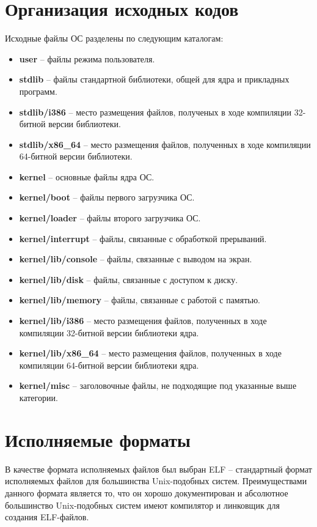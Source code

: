 \section{Организация исходных кодов}
Исходные файлы ОС разделены по следующим каталогам:
\begin{itemize}
\item \textbf{user} -- файлы режима пользователя.
\item \textbf{stdlib} -- файлы стандартной библиотеки, общей для ядра и прикладных программ.
\item \textbf{stdlib/i386} -- место размещения файлов, полученых в ходе компиляции 32-битной
	версии библиотеки.
\item \textbf{stdlib/x86\_64} -- место размещения файлов, полученных в ходе компиляции 64-битной
	версии библиотеки.
\item \textbf{kernel} -- основные файлы ядра ОС.
\item \textbf{kernel/boot} -- файлы первого загрузчика ОС.
\item \textbf{kernel/loader} -- файлы второго загрузчика ОС.
\item \textbf{kernel/interrupt} -- файлы, связанные с обработкой прерываний.
\item \textbf{kernel/lib/console} -- файлы, связанные с выводом на экран.
\item \textbf{kernel/lib/disk} -- файлы, связанные с доступом к диску.
\item \textbf{kernel/lib/memory} -- файлы, связанные с работой с памятью.
\item \textbf{kernel/lib/i386} -- место размещения файлов, полученных в ходе компиляции 32-битной
	версии библиотеки ядра.
\item \textbf{kernel/lib/x86\_64} -- место размещения файлов, полученных в ходе компиляции 64-битной
	версии библиотеки ядра.
\item \textbf{kernel/misc} -- заголовочные файлы, не подходящие под указанные выше категории.
\end{itemize}

\section{Исполняемые форматы}
В качестве формата исполняемых файлов был выбран ELF -- стандартный формат исполняемых файлов
для большинства Unix-подобных систем. Преимуществами данного формата является то, что он хорошо
документирован и абсолютное большинство Unix-подобных систем имеют компилятор и линковщик для
создания ELF-файлов.

